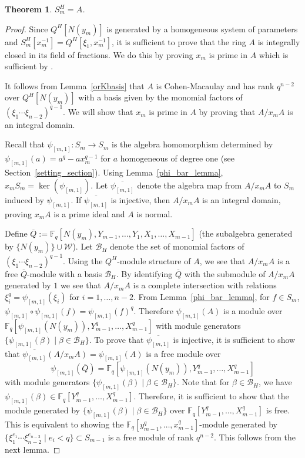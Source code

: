 \documentclass{amsart}
\newcommand{\field}{\mathbb{F}}
\newcommand{\BH}{\mathcal{B}_H}
\newtheorem{thm}[subsection]{Theorem}
\begin{document}
\begin{thm} \label{orHcal} $S_m^H=A$.
\end{thm}
\begin{proof} Since $Q^H[N(y_m)]$ is generated by a homogeneous system of parameters and  $S_m^H[x_m^{-1}]=Q^H[\xi_1,x_m^{-1}]$,
it is sufficient to prove that the ring $A$ is integrally closed in its field of fractions.
 We do this by proving $x_m$ is prime in $A$ which is sufficient by 
 \cite[Theorem 20.2]{matsumura-commringtheo:86}. 


It follows from Lemma~\ref{orKbasis} that $A$ is Cohen-Macaulay and has rank $q^{n-2}$ over
$Q^H[N(y_m)]$ with a basis given by the monomial factors of 
$(\xi_1\cdots\xi_{n-2})^{q-1}$.
We will show that $x_m$ is prime in $A$ by proving that $A/x_mA$ is an integral domain.

Recall that $\psi_{[m,1]}:S_m\to S_m$  is the algebra homomorphism determined by 
$\psi_{[m,1]}(a)=a^q-ax_m^{q-1}$ for $a$ homogeneous of degree one
(see Section~\ref{setting_section}).
Using Lemma~\ref{phi_bar_lemma},
 $x_mS_m= \ker(\psi_{[m,1]})$.
Let $\overline{\psi_{[m,1]}}$ denote the algebra map from $A/x_mA$ to $S_m$ induced by $\psi_{[m,1]}$. 
If $\overline{\psi_{[m,1]}}$ is injective, then $A/x_mA$ is an integral domain, proving $x_mA$ is a prime ideal and $A$ is normal.

  Define 
  $\overline{Q}:=\field_q[N(y_m),Y_{m-1},\ldots,Y_1,X_1,\ldots,X_{m-1}]$ (the subalgebra generated by $\{N(y_m)\}\cup\mathcal{W}$).
  Let $\BH$ denote the set of monomial factors of $(\xi_1\cdots\xi_{n-2})^{q-1}$.
  Using the $Q^H$-module structure of $A$, we see that
  $A/x_mA$ is a free $\overline{Q}$-module with a basis  $\BH$.
  By identifying $\overline{Q}$ with the submodule of $A/x_mA$ generated by $1$ we see that $A/x_mA$ is a complete intersection with relations
  $\xi_{i}^q =\psi_{[m,1]}(\xi_{i})$
  for $i=1,\ldots, n-2 $. From Lemma~\ref{phi_bar_lemma},
 for $f\in S_m$, $\psi_{[m,1]}\circ\psi_{[m,1]}(f)=\psi_{[m,1]}(f)^q$.
  Therefore $\psi_{[m,1]}(A)$ is a module over $\field_q[\psi_{[m,1]}(N(y_m)),Y_{m-1}^q,\dots ,X_{m-1}^q]$ with module generators $\{\psi_{[m,1]}(\beta)\mid \beta\in\BH\}$. 
  To prove that $\overline{\psi_{[m,1]}}$ is injective, it is sufficient to show that $\overline{\psi_{[m,1]}}(A/x_mA)=\psi_{[m,1]}(A)$ is a free module over 
   $$\psi_{[m,1]}(\overline{Q})=\field_q[\psi_{[m,1]}(N(y_m)),Y_{m-1}^q,\dots, X_{m-1}^q]$$ 
   with module generators
   $\{\psi_{[m,1]}(\beta)\mid \beta\in\BH\}$. 
  Note that for $\beta\in\BH$, we have $\psi_{[m,1]}(\beta)\in\field_q[Y_{m-1}^q,\dots, X_{m-1}^q]$.
  Therefore, it is sufficient to show that the 
  module generated by $\{\psi_{[m,1]}(\beta)\mid \beta\in\BH\}$
  over $\field_q[Y_{m-1}^q,\dots, X_{m-1}^q]$ is free. 
This is equivalent to showing the  
  $\field_q[y_{m-1}^q,\dots, x_{m-1}^q]$-module
  generated by $\{\xi_1^{e_1}\cdots\xi_{n-2}^{e_{n-2}}\mid e_i<q\}\subset S_{m-1}$
  is a free module of rank $q^{n-2}$.  This follows from the next lemma.
\end{proof}
\end{document}
